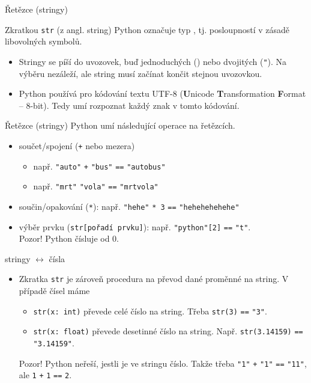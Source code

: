 \documentclass[aspectratio=169,11pt]{beamer}
\begin{document}
\begin{frame}{Řetězce (stringy)}
 \begin{tcolorbox}[title=Datový typ \texttt{str}]
  Zkratkou \alert{\texttt{str}} (z angl. \alert{str}ing) Python označuje typ
  , tj. posloupností v zásadě libovolných symbolů.
 \end{tcolorbox}
 \begin{itemize}
  \item<2-> Stringy se píší do uvozovek, buď jednoduchých
   (\texttt{\textquotesingle}) nebo dvojitých (\texttt{"}). Na výběru nezáleží,
   ale string musí začínat končit stejnou uvozovkou.
  \item<3-> Python používá pro kódování textu UTF-8 (\textbf{U}nicode
   \textbf{T}ransformation \textbf{F}ormat -- 8-bit). Tedy umí rozpoznat každý
   znak v tomto kódování.
 \end{itemize}\end{frame}

\begin{frame}{Řetězce (stringy)}
 Python umí následující operace na řetězcích.
 \begin{itemize}
  \item<1-> součet/spojení (\texttt{+} nebo mezera)
   \begin{itemize}
    \item např. \texttt{"auto"} \texttt{+} \texttt{"bus"} \texttt{==}
     \texttt{"autobus"}
    \item např. \texttt{"mrt"} \texttt{"vola"} \texttt{==} \texttt{"mrtvola"}
   \end{itemize}
  \item<2-> součin/opakování (\texttt{*}): např. \texttt{"hehe"} \texttt{* 3}
   \texttt{==} \texttt{"hehehehehehe"}
  \item<3-> výběr prvku (\texttt{str[pořadí prvku]}): např. \texttt{"python"[2]}
   \texttt{==} \texttt{"t"}.\\
   \alert{Pozor!} Python čísluje od 0.
 \end{itemize}
\end{frame}

\begin{frame}{stringy $\leftrightarrow$ čísla}
 \begin{itemize}
  \item Zkratka \texttt{str} je zároveň procedura na převod dané proměnné na
   string. V případě čísel máme
   \begin{itemize}
    \item \texttt{str(x: int)} převede celé číslo na string. Třeba
     \texttt{str(3)} \texttt{==} \texttt{"3"}.
    \item \texttt{str(x: float)} převede desetinné číslo na string. Např. 
     \texttt{str(3.14159)} \texttt{==} \texttt{"3.14159"}.
   \end{itemize}
   \alert{Pozor!} Python neřeší, jestli je ve stringu číslo. Takže třeba
   \texttt{"1"} \texttt{+} \texttt{"1"} \texttt{==} \texttt{"11"}, ale
   \texttt{1} \texttt{+} \texttt{1} \texttt{==} \texttt{2}.
 \end{itemize}
\end{frame}
\end{document}
